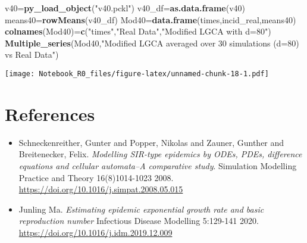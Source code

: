 \documentclass[
]{article}
\newenvironment{Shaded}{\begin{snugshade}}{\end{snugshade}}
\newcommand{\FunctionTok}[1]{\textcolor[rgb]{0.13,0.29,0.53}{\textbf{#1}}}
\newcommand{\NormalTok}[1]{#1}
\newcommand{\OtherTok}[1]{\textcolor[rgb]{0.56,0.35,0.01}{#1}}
\newcommand{\StringTok}[1]{\textcolor[rgb]{0.31,0.60,0.02}{#1}}
\begin{document}
\begin{Shaded}
\begin{Highlighting}[]
\NormalTok{v40}\OtherTok{=}\FunctionTok{py\_load\_object}\NormalTok{(}\StringTok{"v40.pckl"}\NormalTok{)}
\NormalTok{v40\_df}\OtherTok{=}\FunctionTok{as.data.frame}\NormalTok{(v40)}
\NormalTok{means40}\OtherTok{=}\FunctionTok{rowMeans}\NormalTok{(v40\_df)}
\NormalTok{Mod40}\OtherTok{=}\FunctionTok{data.frame}\NormalTok{(times,incid\_real,means40)}
\FunctionTok{colnames}\NormalTok{(Mod40)}\OtherTok{=}\FunctionTok{c}\NormalTok{(}\StringTok{"times"}\NormalTok{,}\StringTok{"Real Data"}\NormalTok{,}\StringTok{"Modified LGCA with d=80"}\NormalTok{)}
\FunctionTok{Multiple\_series}\NormalTok{(Mod40,}\StringTok{"Modified LGCA averaged over 30 simulations (d=80) vs Real Data"}\NormalTok{)}
\end{Highlighting}
\end{Shaded}

\texttt{[image: Notebook\_R0\_files/figure-latex/unnamed-chunk-18-1.pdf]}

\section{\texorpdfstring{\textbf{References}}{References}}\label{references}

\begin{itemize}
\item
  Schneckenreither, Gunter and Popper, Nikolas and Zauner, Gunther and
  Breitenecker, Felix. \emph{Modelling SIR-type epidemics by ODEs, PDEs,
  difference equations and cellular automata--A comparative study}.
  Simulation Modelling Practice and Theory 16(8)1014-1023 2008.
  \url{https://doi.org/10.1016/j.simpat.2008.05.015}
\item
  Junling Ma. \emph{Estimating epidemic exponential growth rate and
  basic reproduction number} Infectious Disease Modelling 5:129-141
  2020. \url{https://doi.org/10.1016/j.idm.2019.12.009}
\end{itemize}
\end{document}
